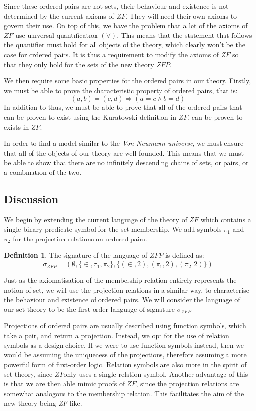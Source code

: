 \documentclass[11pt]{report}
\newcommand{\pleft}{\mathrel{\pi_1}}
\newcommand{\pright}{\mathrel{\pi_2}}
\theoremstyle{definition}
\theoremstyle{theorem}
\theoremstyle{lemma}
\newtheorem{definition}{Definition}[section]
\begin{document}
Since these ordered pairs are not sets, their behaviour and existence is not determined by the current axioms of $\mathit{ZF}$.
They will need their own axioms to govern their use.
On top of this, we have the problem that a lot of the axioms of $\mathit{ZF}$ use universal quantification $(\forall)$.
This means that the statement that follows the quantifier must hold for all objects of the theory, which clearly won't be the case for ordered pairs. 
It is thus a requirement to modify the axioms of $\mathit{ZF}$ so that they only hold for the sets of the new theory $\mathit{ZFP}$. 

We then require some basic properties for the ordered pairs in our theory. 
Firstly, we must be able to prove the characteristic property of ordered pairs, that is:
$$(a,b) = (c,d) \Rightarrow (a = c \wedge b = d)$$
In addition to thus, we must be able to prove that all of the ordered pairs that can be proven to exist using the Kuratowski definition in $\mathit{ZF}$, can be proven to exists in $\mathit{ZF}$.

In order to find a model similar to the \emph{Von-Neumann universe}, we must ensure that all of the objects of our theory are well-founded. 
This means that we must be able to show that there are no infinitely descending chains of sets, or pairs, or a combination of the two. 
 
\subsection{Discussion}\label{zfpaxioms}
We begin by extending the current language of the theory of $\mathit{ZF}$ which contains a single binary predicate symbol for the set membership.
We add symbols $\pleft$ and $\pright$ for the projection relations on ordered pairs. 
\begin{definition}
The signature of the language of $\mathit{ZFP}$ is defined as:
$$\sigma_\mathit{ZFP} = (\emptyset,\{\in, \pleft, \pright\},\{(\in,2),(\pleft,2),(\pright,2)\})$$
\end{definition}
\noindent
Just as the axiomatisation of the membership relation entirely represents the notion of set, we will use the projection relations in a similar way, to characterise the behaviour and existence of ordered pairs.
We will consider the language of our set theory to be the first order language of signature $\sigma_\mathit{ZFP}$.

Projections of ordered pairs are usually described using function symbols, which take a pair, and return a projection.
Instead, we opt for the use of relation symbols as a design choice. 
If we were to use function symbols instead, then we would be assuming the uniqueness of the projections, therefore assuming a more powerful form of first-order logic.
Relation symbols are also more in the spirit of set theory, since $\mathit{ZF}$only uses a single relation symbol. 
Another advantage of this is that we are then able mimic proofs of $\mathit{ZF}$, since the projection relations are somewhat analogous to the membership relation.
This facilitates the aim of the new theory being $\mathit{ZF}$-like.  
\end{document}
